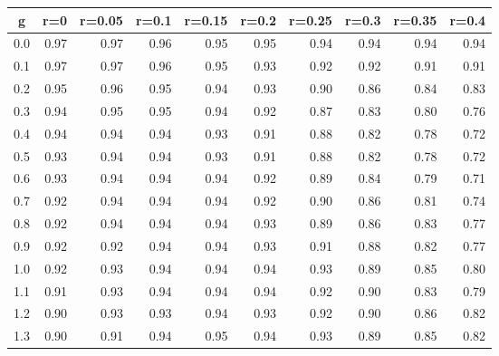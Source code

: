 %
\begin{table}[!tbp]
 \begin{center}
 \begin{tabular}{rrrrrrrrrr}\hline\hline
\multicolumn{1}{c}{g}&\multicolumn{1}{c}{r=0}&\multicolumn{1}{c}{r=0.05}&\multicolumn{1}{c}{r=0.1}&\multicolumn{1}{c}{r=0.15}&\multicolumn{1}{c}{r=0.2}&\multicolumn{1}{c}{r=0.25}&\multicolumn{1}{c}{r=0.3}&\multicolumn{1}{c}{r=0.35}&\multicolumn{1}{c}{r=0.4}\tabularnewline
\hline
0.0&0.97&0.97&0.96&0.95&0.95&0.94&0.94&0.94&0.94\tabularnewline
0.1&0.97&0.97&0.96&0.95&0.93&0.92&0.92&0.91&0.91\tabularnewline
0.2&0.95&0.96&0.95&0.94&0.93&0.90&0.86&0.84&0.83\tabularnewline
0.3&0.94&0.95&0.95&0.94&0.92&0.87&0.83&0.80&0.76\tabularnewline
0.4&0.94&0.94&0.94&0.93&0.91&0.88&0.82&0.78&0.72\tabularnewline
0.5&0.93&0.94&0.94&0.93&0.91&0.88&0.82&0.78&0.72\tabularnewline
0.6&0.93&0.94&0.94&0.94&0.92&0.89&0.84&0.79&0.71\tabularnewline
0.7&0.92&0.94&0.94&0.94&0.92&0.90&0.86&0.81&0.74\tabularnewline
0.8&0.92&0.94&0.94&0.94&0.93&0.89&0.86&0.83&0.77\tabularnewline
0.9&0.92&0.92&0.94&0.94&0.93&0.91&0.88&0.82&0.77\tabularnewline
1.0&0.92&0.93&0.94&0.94&0.94&0.93&0.89&0.85&0.80\tabularnewline
1.1&0.91&0.93&0.94&0.94&0.94&0.92&0.90&0.83&0.79\tabularnewline
1.2&0.90&0.93&0.93&0.94&0.93&0.92&0.90&0.86&0.82\tabularnewline
1.3&0.90&0.91&0.94&0.95&0.94&0.93&0.89&0.85&0.82\tabularnewline
\hline
\end{tabular}

\end{center}

\end{table}

